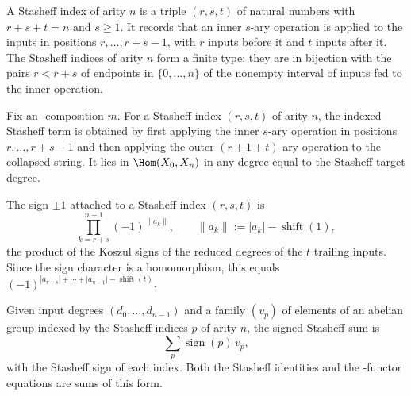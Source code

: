 \begin{definition}
\label{AInfinityTheory.StasheffIndex}
\leanok
A Stasheff index of arity $n$ is a triple $(r,s,t)$ of natural numbers with
$r + s + t = n$ and $s \geq 1$. It records that an inner $s$-ary operation is
applied to the inputs in positions $r,\dots,r+s-1$, with $r$ inputs before it and
$t$ inputs after it. The Stasheff indices of arity $n$ form a finite type: they are
in bijection with the pairs $r < r + s$ of endpoints in $\{0,\dots,n\}$ of the
nonempty interval of inputs fed to the inner operation.
\end{definition}

\begin{definition}
\label{AInfinityTheory.indexedStasheffTerm}
\leanok
{}
Fix an \Ainf{}-composition $m$. For a Stasheff index $(r,s,t)$ of arity $n$, the
indexed Stasheff term is obtained by first applying the inner $s$-ary operation in
positions $r,\dots,r+s-1$ and then applying the outer $(r+1+t)$-ary operation to
the collapsed string. It lies in $\Hom(X_0,X_n)$ in any degree equal to the
Stasheff target degree.
\end{definition}

\begin{definition}
\label{AInfinityTheory.stasheffSign}
\leanok
{}
The sign $\pm 1$ attached to a Stasheff index $(r,s,t)$ is
\[
  \prod_{k=r+s}^{n-1} (-1)^{\|a_k\|},
  \qquad
  \|a_k\| := |a_k| - \operatorname{shift}(1),
\]
the product of the Koszul signs of the reduced degrees of the $t$ trailing
inputs. Since the sign character is a homomorphism, this equals
$(-1)^{|a_{r+s}| + \cdots + |a_{n-1}| - \operatorname{shift}(t)}$.
\end{definition}

\begin{definition}
\label{AInfinityTheory.signedStasheffSum}
\leanok
{}
Given input degrees $(d_0,\dots,d_{n-1})$ and a family $(v_p)$ of elements of an
abelian group indexed by the Stasheff indices $p$ of arity $n$, the signed Stasheff
sum is
\[
  \sum_{p} \operatorname{sign}(p)\, v_p,
\]
with the Stasheff sign of each index. Both the Stasheff identities and the
\Ainf{}-functor equations are sums of this form.
\end{definition}

